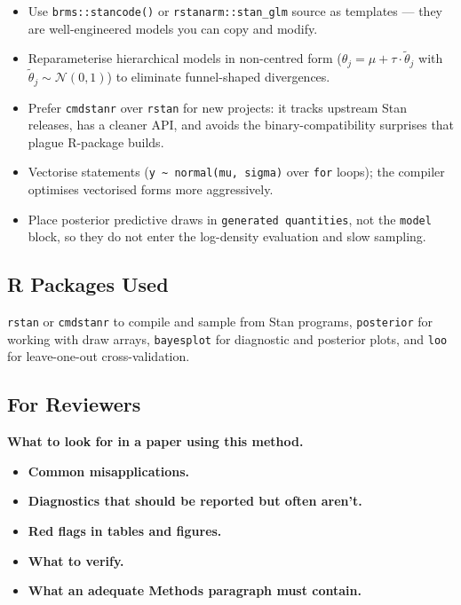 \documentclass[
]{article}
\providecommand{\tightlist}{%
  \setlength{\itemsep}{0pt}\setlength{\parskip}{0pt}}
\begin{document}
\begin{itemize}
\tightlist
\item
  Use \texttt{brms::stancode()} or \texttt{rstanarm::stan\_glm} source
  as templates --- they are well-engineered models you can copy and
  modify.
\item
  Reparameterise hierarchical models in non-centred form
  (\(\theta_j = \mu + \tau \cdot \tilde\theta_j\) with
  \(\tilde\theta_j \sim \mathcal N(0,1)\)) to eliminate funnel-shaped
  divergences.
\item
  Prefer \texttt{cmdstanr} over \texttt{rstan} for new projects: it
  tracks upstream Stan releases, has a cleaner API, and avoids the
  binary-compatibility surprises that plague R-package builds.
\item
  Vectorise statements
  (\texttt{y\ \textasciitilde{}\ normal(mu,\ sigma)} over \texttt{for}
  loops); the compiler optimises vectorised forms more aggressively.
\item
  Place posterior predictive draws in \texttt{generated\ quantities},
  not the \texttt{model} block, so they do not enter the log-density
  evaluation and slow sampling.
\end{itemize}

\subsection{R Packages Used}\label{r-packages-used}

\texttt{rstan} or \texttt{cmdstanr} to compile and sample from Stan
programs, \texttt{posterior} for working with draw arrays,
\texttt{bayesplot} for diagnostic and posterior plots, and \texttt{loo}
for leave-one-out cross-validation.

\subsection{For Reviewers}\label{for-reviewers}

\textbf{What to look for in a paper using this method.}

\begin{itemize}
\tightlist
\item
  \textbf{Common misapplications.}
\item
  \textbf{Diagnostics that should be reported but often aren't.}
\item
  \textbf{Red flags in tables and figures.}
\item
  \textbf{What to verify.}
\item
  \textbf{What an adequate Methods paragraph must contain.}
\end{itemize}
\end{document}
